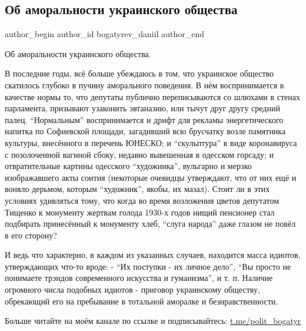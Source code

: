  
 
 
 
 
 
\subsection{Об аморальности украинского общества}
\label{sec:28_11_2021.fb.bogatyrev_daniil.1.obschestvo_amoralnost}
 
\ifcmt
 author_begin
   author_id bogatyrev_daniil
 author_end
\fi

Об аморальности украинского общества.

В последние годы, всё больше убеждаюсь в том, что украинское общество скатилось
глубоко в пучину аморального поведения. В нём воспринимается в качестве нормы
то, что депутаты публично переписываются со шлюхами в стенах парламента,
призывают узаконить эвтаназию, или тычут друг другу средний палец. \enquote{Нормальным}
воспринимается и дрифт для рекламы энергетического напитка по Софиевской
площади, загадивший всю брусчатку возле памятника культуры, внесённого в
перечень ЮНЕСКО; и \enquote{скульптура} в виде коронавируса с позолоченной вагиной
сбоку, недавно вывешенная в одесском горсаду; и отвратительные картины
одесского \enquote{художника}, вульгарно и мерзко изображавшего акты соития (некоторые
очевидцы утверждают, что от них ещё и воняло дерьмом, которым \enquote{художник},
якобы, их мазал). Стоит ли в этих условиях удивляться тому, что когда во время
возложения цветов депутатом Тищенко к монументу жертвам голода 1930-х годов
нищий пенсионер стал подбирать принесённый к монументу хлеб, \enquote{слуга народа}
даже глазом не повёл в его сторону?

И ведь что характерно, в каждом из указанных случаев, находится масса идиотов,
утверждающих что-то вроде: - \enquote{Их поступки - их личное дело}, \enquote{Вы просто не
понимаете трэндов современного искусства и гуманизма}, и т. п. Наличие
огромного числа подобных идиотов - приговор украинскому обществу, обрекающий
его на пребывание в тотальной аморалке и безнравственности.

Больше читайте на моём канале по ссылке и подписывайтесь: \url{t.me/polit_bogatyr}
